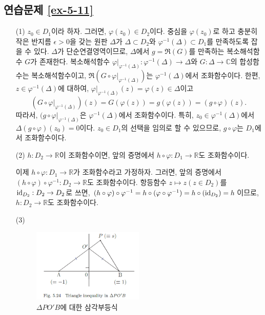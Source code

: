 \subsection*{연습문제 \ref{ex-5-11}}
\begin{itemize}
\item[(1)] 
$z_0\in D_1$이라 하자. 그러면, $\varphi(z_0)\in D_2$이다.
중심을 $\varphi(z_0)$로 하고 충분히 작은 반지름 $\epsilon>0$을 갖는
원판 $\Delta$가 $\Delta \subset D_2$와 $\varphi^{-1}(\Delta) \subset D_1$를
만족하도록 잡을 수 있다.
$\Delta$가 단순연결영역이므로, $\Delta$에서 $g=\Re(G)$를 만족하는
복소해석함수 $G$가 존재한다.
복소해석함수 $\varphi|_{\varphi^{-1}(\Delta)}: \varphi^{-1}(\Delta)\to \Delta$와
$G: \Delta \to \mathbb C$의 합성함수는 복소해석함수이고,
$\Re(G\circ\varphi|_{\varphi^{-1}(\Delta)})$는 $\varphi^{-1}(\Delta)$에서
조화함수이다. 
한편, $z\in \varphi^{-1}(\Delta)$에 대하여, 
$\varphi|_{\varphi^{-1}(\Delta)}(z)  = \varphi(z)\in \Delta$이고
\[
(G\circ \varphi|_{\varphi^{-1}(\Delta)})(z)
= G(\varphi(z)) = g(\varphi(z)) = (g\circ \varphi)(z).
\]
따라서, $(g\circ \varphi|_{\varphi^{-1}(\Delta)}$은 
$\varphi^{-1}(\Delta)$에서 조화함수이다.
특히, $z_0\in \varphi^{-1}(\Delta)$에서 
$\Delta(g\circ \varphi)(z_0)=0$이다.
$z_0\in D_1$의 선택을 임의로 할 수 있으므로, $g\circ \varphi$는 $D_1$에서 조화함수이다.

\item[(2)] $h:D_2\to\mathbb R$이 조화함수이면, 앞의 증명에서
$h\circ \varphi : D_1 \to \mathbb R$도 조화함수이다.

이제 $h\circ \varphi : D_1 \to \mathbb R$가 조화함수라고 가정하자.
그러면, 앞의 증명에서 $(h\circ\varphi)\circ\varphi^{-1}:D_2 \to \mathbb R$도 조화함수이다.
항등함수 $z\mapsto z (z\in D_2)$를 ${\rm id}_{D_2}: D_2 \to D_2$로 쓰면,
$(h\circ \varphi)\circ \varphi^{-1} = h\circ(\varphi \circ \varphi^{-1})
= h\circ ({\rm id}_{D_2}) =h$이므로,
$h:D_2\to\mathbb R$도 조화함수이다. 

\item[(3)] \

\begin{figure}[h!]
\begin{center}
\includegraphics[width=0.5\textwidth]{./figs/fig-5-24}
\end{center}
\caption{$\Delta PO'B$에 대한 삼각부등식
}
\label{fig-5-24}
\end{figure}


\end{itemize}
